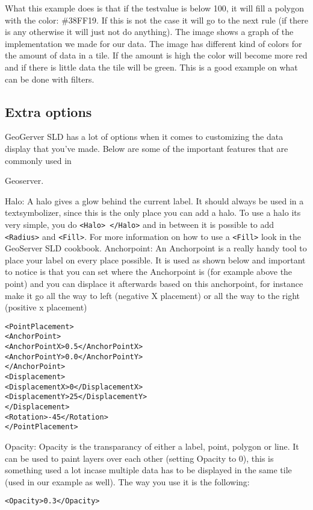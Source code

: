 What this example does is that if the testvalue is below 100, it will fill a polygon with the color: \#38FF19. If this is not the case it will go to the next rule (if there is any otherwise it will just not do anything). The image shows a graph of the implementation we made for our data. The image has different kind of colors for the amount of data in a tile. If the amount is high the color will become more red and if there is little data the tile will be green. This is a good example on what can be done with filters.

\subsection{Extra options}

GeoGerver SLD has a lot of options when it comes to customizing the data display that you've made. Below are some of the important features that are commonly used in 

Geoserver.

Halo: A halo gives a glow behind the current label. It should always be used in a textsymbolizer, since this is the only place you can add a halo. To use a halo its very simple, you do \lstinline|<Halo> </Halo>| and in between it is possible to add \lstinline|<Radius>| and \lstinline|<Fill>|. For more information on how to use a \lstinline|<Fill>| look in the GeoServer SLD cookbook.
\newline
Anchorpoint: An Anchorpoint is a really handy tool to place your label on every place possible. It is used as shown below and important to notice is that you can set where the Anchorpoint is (for example above the point) and you can displace it afterwards based on this anchorpoint, for instance make it go all the way to left (negative X placement) or all the way to the right (positive x placement)
\begin{lstlisting}
<PointPlacement>
<AnchorPoint>
<AnchorPointX>0.5</AnchorPointX>
<AnchorPointY>0.0</AnchorPointY>
</AnchorPoint>
<Displacement>
<DisplacementX>0</DisplacementX>
<DisplacementY>25</DisplacementY>
</Displacement>
<Rotation>-45</Rotation>
</PointPlacement>
\end{lstlisting}
Opacity: Opacity is the transparancy of either a label, point, polygon or line. It can be used to paint layers over each other (setting Opacity to 0), this is something used a lot incase multiple data has to be displayed in the same tile (used in our example as well). The way you use it is the following:

\lstinline|<Opacity>0.3</Opacity>|


